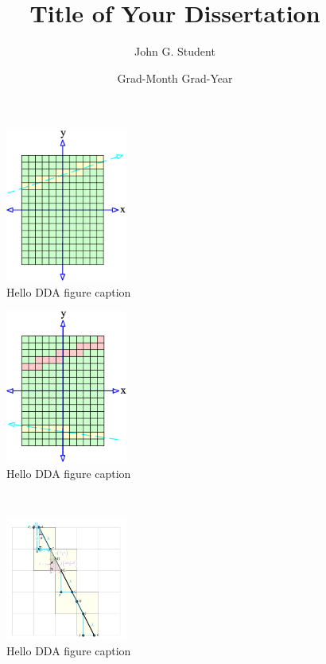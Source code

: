 \documentclass{thesis}
\title{Title of Your Dissertation}                                      %
\author{John G. Student}                                                %
\date{Grad-Month Grad-Year}                                             %
\begin{document}
	

	\begin{figure}
	  \centering
	  \includegraphics[width=4cm]{Space_Carving_1.png}
	  \caption{Hello DDA figure caption }\label{fig:DDA}
	\end{figure}
	\begin{figure}
	  \centering
	  \includegraphics[width=4cm]{Space_Carving_2.png}
	  \caption{Hello DDA figure caption}\label{fig:DDA}
	\end{figure}~

	\begin{figure}
	  \centering
	  \includegraphics[width=4cm]{DDA.png}
	  \caption{Hello DDA figure caption}\label{fig:DDA}
	\end{figure}



\end{document}
